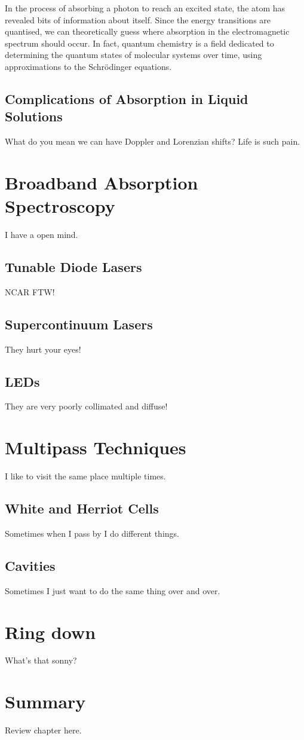 In the process of absorbing a photon to reach an excited state, the atom has revealed bits of information about itself. Since the energy transitions are quantised, we can theoretically guess where absorption in the electromagnetic spectrum should occur.  In fact, quantum chemistry is a field dedicated to determining the quantum states of molecular systems over time, using approximations to the Schr\"odinger equations.

\subsection{Complications of Absorption in Liquid Solutions}

What do you mean we can have Doppler and Lorenzian shifts? Life is such pain.

\section{Broadband Absorption Spectroscopy}
I have a open mind.

\subsection{Tunable Diode Lasers}
NCAR FTW!

\subsection{Supercontinuum Lasers}
They hurt your eyes!

\subsection{LEDs}
They are very poorly collimated and diffuse!

\section{Multipass Techniques}
I like to visit the same place multiple times.

\subsection{White and Herriot Cells}
Sometimes when I pass by I do different things.

\subsection{Cavities}
Sometimes I just want to do the same thing over and over.

\section{Ring down}
What's that sonny?

\section{Summary}
Review chapter here.
